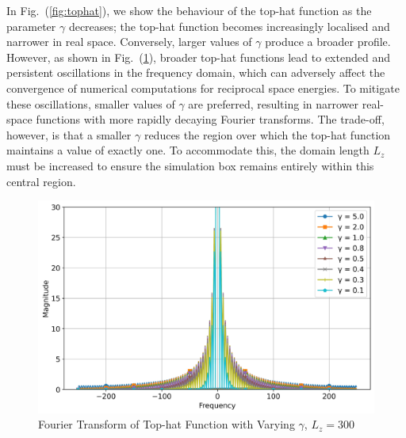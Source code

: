 In Fig.~(\ref{fig:tophat}), we show the behaviour of the top-hat function as the parameter $\gamma$ decreases; the top-hat function becomes increasingly localised and narrower in real space. Conversely, larger values of $\gamma$ produce a broader profile. However, as shown in Fig.~(\ref{fig:fourieroftophatvarygammaL300}), broader top-hat functions lead to extended and persistent oscillations in the frequency domain, which can adversely affect the convergence of numerical computations for reciprocal space energies. To mitigate these oscillations, smaller values of $\gamma$ are preferred, resulting in narrower real-space functions with more rapidly decaying Fourier transforms. The trade-off, however, is that a smaller $\gamma$ reduces the region over which the top-hat function maintains a value of exactly one. To accommodate this, the domain length $L_z$ must be increased to ensure the simulation box remains entirely within this central region.

\begin{figure}[htbp]
  \centering
  \includegraphics[width=\linewidth]{images/fourieroftophatvarygammaL300.jpg}
  \caption{Fourier Transform of Top-hat Function with Varying $\gamma$, $L_z = 300$}
  \label{fig:fourieroftophatvarygammaL300}
\end{figure}
  

